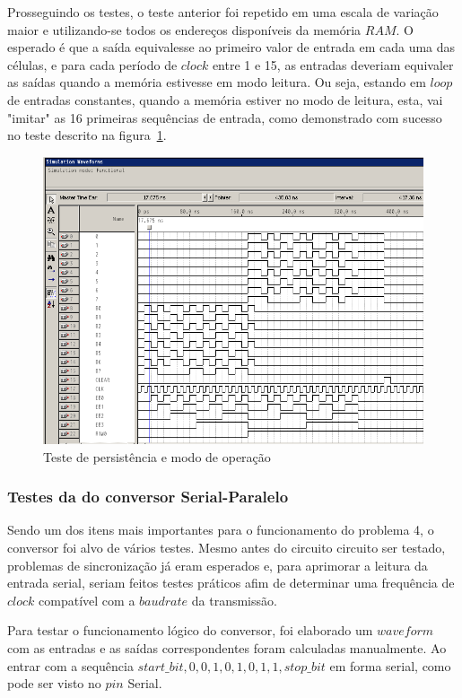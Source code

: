 \documentclass[12pt]{article}
\begin{document}
Prosseguindo os testes, o teste anterior foi repetido em uma escala de variação maior e utilizando-se todos os endereços disponíveis da memória $RAM$. O esperado é que a saída equivalesse ao primeiro valor de entrada em cada uma das células, e para cada período de $clock$ entre 1 e 15, as entradas deveriam equivaler as saídas quando a memória estivesse em modo leitura. Ou seja, estando em $loop$ de entradas constantes, quando a memória estiver no modo de leitura, esta, vai "imitar" as 16 primeiras sequências de entrada, como demonstrado com sucesso no teste descrito na figura~\ref{fig:ramtest2}.

\begin{figure}[h]
\centering
\includegraphics[width=1\textwidth]{img/testram2.png}
\caption{Teste de persistência e modo de operação}
\label{fig:ramtest2}
\end{figure}

\subsubsection{Testes da do conversor Serial-Paralelo}
Sendo um dos itens mais importantes para o funcionamento do problema 4, o conversor foi alvo de vários testes. Mesmo antes do circuito circuito ser testado, problemas de sincronização já eram esperados e, para aprimorar a leitura da entrada serial, seriam feitos testes práticos afim de determinar uma frequência de $clock$ compatível com a $baud rate$ da transmissão.

Para testar o funcionamento lógico do conversor, foi elaborado um $waveform$ com as entradas e as saídas correspondentes foram calculadas manualmente. Ao entrar com a sequência $start\_bit, 0, 0, 1, 0, 1, 0, 1, 1, stop\_bit$ em forma serial, como pode ser visto no $pin$ Serial.
\end{document}
